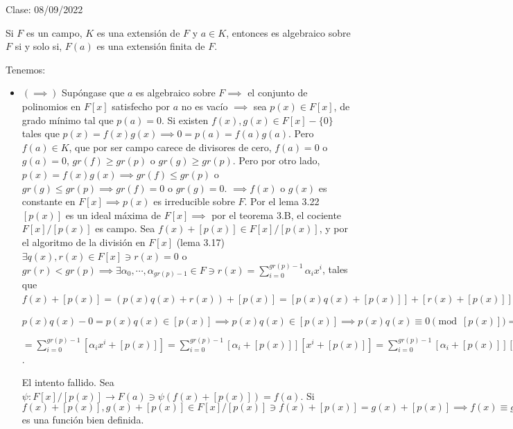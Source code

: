 Clase: 08/09/2022

\begin{teorema}[5B]
    Si $F$ es un campo, $K$ es una extensión de $F$ y $a\in K$, entonces es algebraico sobre $F$ si y solo si, $F(a)$ es una extensión finita de $F$. 
    \begin{dem}
        Tenemos:
        \begin{itemize}
            \item $(\implies)$  Supóngase que $a$ es algebraico sobre $F\implies$ el conjunto de polinomios en $F[x]$ satisfecho por $a$ no es vacío $\implies$ sea $p(x)\in F[x]$, de grado mínimo tal que $p(a)=0$. Si existen $f(x),g(x)\in F[x]-\{0\}$ tales que $p(x)=f(x)g(x)\implies 0=p(a)=f(a)g(a)$. Pero $f(a)\in K$, que por ser campo carece de divisores de cero, $f(a)=0$ o $g(a)=0$, $gr(f)\geq gr(p)$ o $gr(g)\geq gr(p)$. Pero por otro lado, $p(x)=f(x)g(x)\implies gr(f)\leq gr(p)$ o $gr(g)\leq gr(p)\implies gr(f)=0$ o $gr(g)=0$. $\implies f(x)$ o $g(x)$ es constante en $F[x]\implies p(x)$ es irreducible sobre $F$. Por el lema 3.22 $[p(x)]$ es un ideal máxima de $F[x]\implies$ por el teorema 3.B, el cociente $F[x]/[p(x)]$ es campo. Sea $f(x)+[p(x)]\in F[x]/[p(x)]$, y por el algoritmo de la división en $F[x]$ (lema 3.17) $\exists q(x),r(x)\in F[x]\ni r(x)=0$ o $gr(r)<gr(p)\implies \exists \alpha_0,\cdots,\alpha_{gr(p)-1}\in F\ni r(x)=\sum_{i=0}^{gr(p)-1}\alpha_ix^i$, tales que $f(x)+[p(x)]=(p(x)q(x)+r(x))+[p(x)]=[p(x)q(x)+[p(x)]]+[r(x)+[p(x)]]=[p(x)]+[r(x)+[p(x)]]=r(x)+[p(x)]=\sum_{i=0}^{gr(p)-1}a_ix^i + [p(x)]=$
            \begin{cajita}
                $p(x)q(x)-0 = p(x)q(x)\in [p(x)]\implies p(x)q(x)\in [p(x)]\implies p(x)q(x)\equiv 0\pmod [p(x)]\implies p(x)q(x)+[p(x)]=[p(x)]$
            \end{cajita}
            $=\sum_{i=0}^{gr(p)-1}[\alpha_ix^i + [p(x)]]=\sum_{i=0}^{gr(p)-1}[\alpha_i+[p(x)]][x^i + [p(x)]] = \sum_{i=0}^{gr(p)-1}[\alpha_i+ [p(x)]][x+[p(x)]]^i$.
            
            \begin{cajita}
                El intento fallido. 
                Sea $\psi: F[x]/[p(x)]\to F(a)\ni \psi(f(x)+[p(x)])=f(a)$. Si $f(x)+[p(x)], g(x)+[p(x)]\in F[x]/[p(x)]\ni f(x)+[p(x)]=g(x)+[p(x)]\implies f(x)\equiv g(x)\pmod (p(x))\implies f(x)-g(x)\in [p(x)]\implies \exists q(x)\in F[x]\ni p(x)q(x)=f(x)-q(x)\implies f(x)=g(x)+p(x)q(x)\implies f(a)=\psi[f(x)+[p(x)]]=\psi[(g(x)+p(x)+q(x))+[p(x)]]=g(a)+p(a)q(a) = g(a)+0q(a)=q(a)=\psi(g(x)+[p(x)])\implies \psi$ es una función bien definida. \break 
                

\end{cajita}
\end{itemize}
\end{dem}
\end{teorema}
